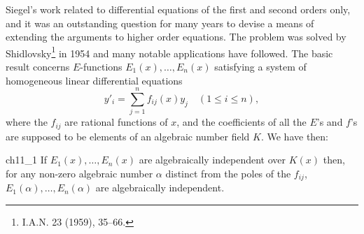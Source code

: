 Siegel's work related to differential equations of the first and second orders only, and it was an outstanding question for many years to devise a means of extending the arguments to higher order equations. The problem was solved by Shidlovsky\footnote{I.A.N. 23 (1959), 35--66.} in 1954 and many notable applications have followed. The basic result concerns $E$-functions $E_1(x), \dots, E_n(x)$ satisfying a system of homogeneous linear differential equations
\[y'_{i} = \sum_{j=1}^{n} f_{ij}(x) y_{j} \quad (1 \leq i \leq n), \tag{1}\label{eq:ch11_1}\]
where the $f_{ij}$ are rational functions of $x$, and the coefficients of all the $E$'s and $f$'s are supposed to be elements of an algebraic number field $K$. We have then:

\begin{mythm}{}{ch11_1}
If $E_1(x), \dots, E_n(x)$ are algebraically independent over $K(x)$ then, for any non-zero algebraic number $\alpha$ distinct from the poles of the $f_{ij}$, $E_1(\alpha), \dots, E_n(\alpha)$ are algebraically independent.
\end{mythm}

